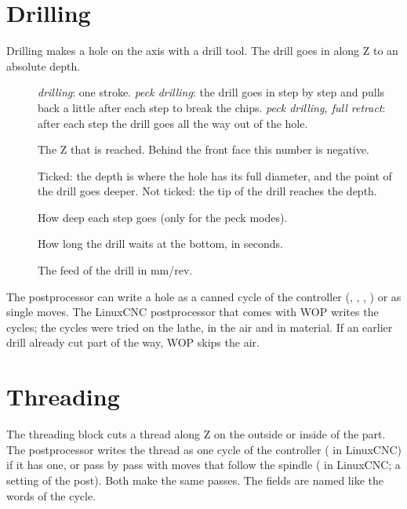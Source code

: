 \section{Drilling}\label{sec:blocks:drilling}


Drilling makes a hole on the axis with a drill tool. The drill goes in along Z to an absolute depth.

\begin{description}
\item[] \emph{drilling}: one stroke. \emph{peck drilling}: the drill goes in step by step and pulls back a little after each step to break the chips. \emph{peck drilling, full retract}: after each step the drill goes all the way out of the hole.
\item[] The Z that is reached. Behind the front face this number is negative.
\item[] Ticked: the depth is where the hole has its full diameter, and the point of the drill goes deeper. Not ticked: the tip of the drill reaches the depth.
\item[] How deep each step goes (only for the peck modes).
\item[] How long the drill waits at the bottom, in seconds.
\item[] The feed of the drill in mm/rev.
\end{description}

The postprocessor can write a hole as a canned cycle of the controller (, , , ) or as single moves. The LinuxCNC postprocessor that comes with WOP writes the cycles; the cycles were tried on the lathe, in the air and in material. If an earlier drill already cut part of the way, WOP skips the air.

\section{Threading}\label{sec:blocks:threading}


The threading block cuts a thread along Z on the outside or inside of the part. The postprocessor writes the thread as one cycle of the controller ( in LinuxCNC) if it has one, or pass by pass with moves that follow the spindle ( in LinuxCNC; a setting of the post). Both make the same passes. The fields are named like the words of the cycle.

